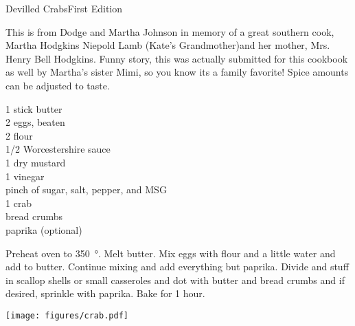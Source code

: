 \begin{entry}{Devilled Crabs}{First Edition}

\begin{open}
  This is from Dodge and Martha Johnson in memory of a great southern cook, Martha Hodgkins Niepold Lamb (Kate's Grandmother)and her mother, Mrs. Henry Bell Hodgkins. Funny story, this was actually submitted for this cookbook as well by Martha's sister Mimi, so you know its a family favorite! Spice amounts can be adjusted to taste.
\end{open}
\begin{ingredients}
  1 stick butter\\
  2 eggs, beaten\\
  \SI{2}{\tblspoon} flour\\
  \SI{1/2}{\teaspoon} Worcestershire sauce\\
  \SI{1}{\teaspoon} dry mustard\\
  \SI{1}{\tblspoon} vinegar\\
  pinch of sugar, salt, pepper, and MSG\\
  \SI{1}{\pound} crab\\
  bread crumbs \\
  paprika (optional)
\end{ingredients}
Preheat oven to \SI{350}{\degree}.  Melt butter. Mix eggs with flour and a little water and add
to butter. Continue mixing and add everything but paprika. Divide and stuff in scallop shells or
small casseroles and dot with butter and bread crumbs and if desired, sprinkle with paprika. Bake for 1 hour.
\begin{center}
    \texttt{[image: figures/crab.pdf]}
\end{center}
\end{entry}

